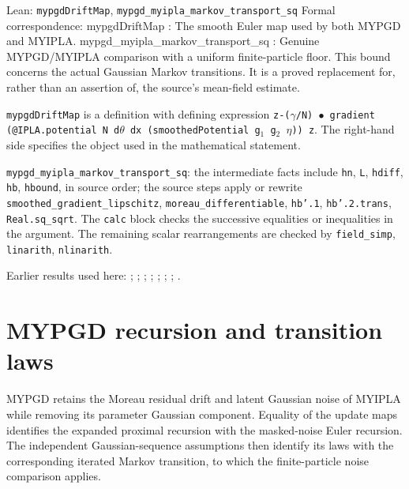 \documentclass[11pt,a4paper]{report}
\begin{document}
\begin{leanbox}{Lean: \texttt{mypgdDriftMap}, \texttt{mypgd\_\allowbreak{}myipla\_\allowbreak{}markov\_\allowbreak{}transport\_\allowbreak{}sq}}
Formal correspondence: mypgdDriftMap : The smooth Euler map used by both MYPGD and MYIPLA. mypgd\_myipla\_markov\_transport\_sq : Genuine MYPGD/\allowbreak{}MYIPLA comparison with a uniform finite-particle floor. This bound concerns the actual Gaussian Markov transitions. It is a proved replacement for, rather than an assertion of, the source's mean-field estimate.



\texttt{mypgd\allowbreak{}Drift\allowbreak{}Map} is a definition with defining expression \texttt{z-\allowbreak{}(\ensuremath{\gamma}/\allowbreak{}N) \ensuremath{\bullet} gradient (@IPLA.\allowbreak{}potential N d\ensuremath{\theta} dx (smoothed\allowbreak{}Potential g\ensuremath{{}_{1}} g\ensuremath{{}_{2}} \ensuremath{\eta})) z}. The right-hand side specifies the object used in the mathematical statement.



\texttt{mypgd\_\allowbreak{}myipla\_\allowbreak{}markov\_\allowbreak{}transport\_\allowbreak{}sq}: the intermediate facts include \texttt{hn}, \texttt{L}, \texttt{hdiff}, \texttt{hb}, \texttt{hbound}, in source order; the source steps apply or rewrite \texttt{smoothed\_\allowbreak{}gradient\_\allowbreak{}lipschitz}, \texttt{moreau\_\allowbreak{}differentiable}, \texttt{hb'.\allowbreak{}1}, \texttt{hb'.\allowbreak{}2.\allowbreak{}trans}, \texttt{Real.\allowbreak{}sq\_\allowbreak{}sqrt}. The \texttt{calc} block checks the successive equalities or inequalities in the argument. The remaining scalar rearrangements are checked by \texttt{field\_\allowbreak{}simp}, \texttt{linarith}, \texttt{nlinarith}.
\end{leanbox}


Earlier results used here: \cite[Section~3.10.7]{LangevinLean2026ULASC}; \cite[Section~3.17.3]{LangevinLean2026ULASC}; \cite[Section~3.17.4]{LangevinLean2026ULASC}; \cite[Section~3.33.6]{LangevinLean2026ULASC}; \cite[Section~3.1.1]{LangevinLean2026IPLA}; \cite[Section~3.1.3]{LangevinLean2026IPLA}; \cite[Section~3.1.4]{LangevinLean2026IPLA}; \cite[Section~3.7.1]{LangevinLean2026IPLA}.
\section{\texorpdfstring{MYPGD recursion and transition laws}{MYPGD recursion and transition laws}}
\label{proof-module-ProximalLangevin-MYPGDAlgorithm-lean}


MYPGD retains the Moreau residual drift and latent Gaussian noise of MYIPLA while removing its parameter Gaussian component. Equality of the update maps identifies the expanded proximal recursion with the masked-noise Euler recursion. The independent Gaussian-sequence assumptions then identify its laws with the corresponding iterated Markov transition, to which the finite-particle noise comparison applies.
\end{document}
